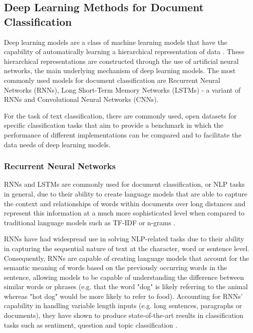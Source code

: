 \documentclass[a4paper,twoside,phd]{BYUPhys}
\begin{document}
\subsection{Deep Learning Methods for Document Classification}
\label{sec:DLDocumentClassification}

Deep learning models are a class of machine learning models that have the capability of automatically learning a hierarchical representation of data \cite{Basheer2000}. These hierarchical representations are constructed through the use of artificial neural networks, the main underlying mechanism of deep learning models. The most commonly used models for document classification are Recurrent Neural Networks (RNNs), Long Short-Term Memory Networks (LSTMs) - a variant of RNNs and Convolutional Neural Networks (CNNs). \newline

For the task of text classification, there are commonly used, open datasets for specific classification tasks that aim to provide a benchmark in which the performance of different implementations can be compared and to facilitate the data needs of deep learning models. 

\subsubsection{Recurrent Neural Networks}
\label{sec:RNN}

RNNs and LSTMs are commonly used for document classification, or NLP tasks in general, due to their ability to create language models that are able to capture the context and relationships of words within documents over long distances and represent this information at a much more sophisticated level when compared to traditional language models such as TF-IDF or n-grams \cite{Young}. \newline
 
RNNs have had widespread use in solving NLP-related tasks due to their ability in capturing the sequential nature of text at the character, word or sentence level. Consequently, RNNs are capable of creating language models that account for the semantic meaning of words based on the previously occurring words in the sentence, allowing models to be capable of understanding the difference between similar words or phrases (e.g. that the word "dog" is likely referring to the animal whereas "hot dog" would be more likely to refer to food). Accounting for RNNs' capability in handling variable length inputs (e.g. long sentences, paragraphs or documents), they have shown to produce state-of-the-art results in classification tasks such as sentiment, question and topic classification \cite{Howard2018}.\newline
\end{document}
